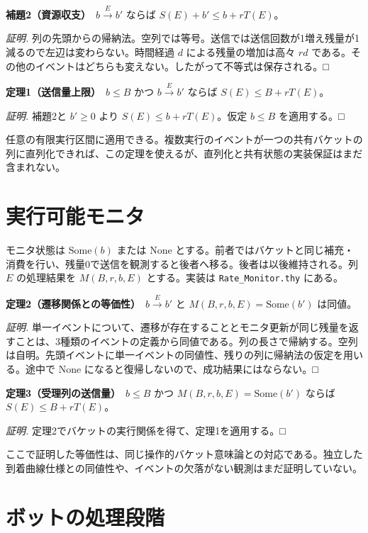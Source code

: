 \documentclass[
  japanese,
]{ltjsarticle}
\begin{document}
\textbf{補題2（資源収支）}　\(b\xrightarrow{E}b'\) ならば
\(S(E)+b'\le b+rT(E)\)。

\emph{証明.}
列の先頭からの帰納法。空列では等号。送信では送信回数が1増え残量が1減るので左辺は変わらない。時間経過
\(d\) による残量の増加は高々 \(rd\)
である。その他のイベントはどちらも変えない。したがって不等式は保存される。□

\textbf{定理1（送信量上限）}　\(b\le B\) かつ \(b\xrightarrow{E}b'\)
ならば \(S(E)\le B+rT(E)\)。

\emph{証明.} 補題2と \(b'\ge0\) より \(S(E)\le b+rT(E)\)。仮定
\(b\le B\) を適用する。□

任意の有限実行区間に適用できる。複数実行のイベントが一つの共有バケットの列に直列化できれば、この定理を使えるが、直列化と共有状態の実装保証はまだ含まれない。

\section{実行可能モニタ}\label{ux5b9fux884cux53efux80fdux30e2ux30cbux30bf}

モニタ状態は \(\mathrm{Some}(b)\) または \(\mathrm{None}\)
とする。前者ではバケットと同じ補充・消費を行い、残量0で送信を観測すると後者へ移る。後者は以後維持される。列
\(E\) の処理結果を \(M(B,r,b,E)\) とする。実装は
\texttt{Rate\_Monitor.thy} にある。

\textbf{定理2（遷移関係との等価性）}　\(b\xrightarrow{E}b'\) と
\(M(B,r,b,E)=\mathrm{Some}(b')\) は同値。

\emph{証明.}
単一イベントについて、遷移が存在することとモニタ更新が同じ残量を返すことは、3種類のイベントの定義から同値である。列の長さで帰納する。空列は自明。先頭イベントに単一イベントの同値性、残りの列に帰納法の仮定を用いる。途中で
\(\mathrm{None}\) になると復帰しないので、成功結果にはならない。□

\textbf{定理3（受理列の送信量）}　\(b\le B\) かつ
\(M(B,r,b,E)=\mathrm{Some}(b')\) ならば \(S(E)\le B+rT(E)\)。

\emph{証明.} 定理2でバケットの実行関係を得て、定理1を適用する。□

ここで証明した等価性は、同じ操作的バケット意味論との対応である。独立した到着曲線仕様との同値性や、イベントの欠落がない観測はまだ証明していない。

\section{ボットの処理段階}\label{ux30dcux30c3ux30c8ux306eux51e6ux7406ux6bb5ux968e}
\end{document}
